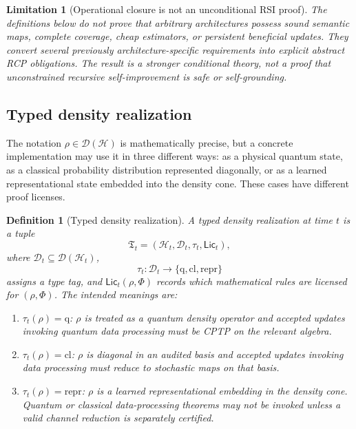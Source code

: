\documentclass[11pt]{article}
\newtheorem{definition}[theorem]{Definition}
\newtheorem{limitation}[theorem]{Limitation}
\newcommand{\D}{\mathcal{D}}
\newcommand{\Hcal}{\mathcal{H}}
\newcommand{\1}{\mathbf{1}}
\begin{document}
\begin{limitation}[Operational closure is not an unconditional RSI proof]
The definitions below do not prove that arbitrary architectures possess sound semantic maps, complete coverage, cheap estimators, or persistent beneficial updates.  They convert several previously architecture-specific requirements into explicit abstract RCP obligations.  The result is a stronger conditional theory, not a proof that unconstrained recursive self-improvement is safe or self-grounding.
\end{limitation}

\subsection{Typed density realization}

The notation \(\rho\in\D(\Hcal)\) is mathematically precise, but a concrete implementation may use it in three different ways: as a physical quantum state, as a classical probability distribution represented diagonally, or as a learned representational state embedded into the density cone.  These cases have different proof licenses.

\begin{definition}[Typed density realization]
\label{def:typed_density_realization}
A typed density realization at time \(t\) is a tuple
\[
\mathfrak T_t=(\Hcal_t,\D_t,\tau_t,\mathsf{Lic}_t),
\]
where \(\D_t\subseteq\D(\Hcal_t)\),
\[
\tau_t:\D_t\to\{\mathrm q,\mathrm{cl},\mathrm{repr}\}
\]
assigns a type tag, and \(\mathsf{Lic}_t(\rho,\Phi)\) records which mathematical rules are licensed for \((\rho,\Phi)\).  The intended meanings are:
\begin{enumerate}[label=(\alph*)]
    \item \(\tau_t(\rho)=\mathrm q\): \(\rho\) is treated as a quantum density operator and accepted updates invoking quantum data processing must be CPTP on the relevant algebra.
    \item \(\tau_t(\rho)=\mathrm{cl}\): \(\rho\) is diagonal in an audited basis and accepted updates invoking data processing must reduce to stochastic maps on that basis.
    \item \(\tau_t(\rho)=\mathrm{repr}\): \(\rho\) is a learned representational embedding in the density cone.  Quantum or classical data-processing theorems may not be invoked unless a valid channel reduction is separately certified.
\end{enumerate}
\end{definition}
\end{document}
